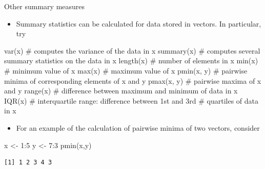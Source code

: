 \documentclass[
  9pt,
  a4paper,
  ignorenonframetext,
  notheorems]{beamer}
\newenvironment{Shaded}{\begin{snugshade}}{\end{snugshade}}
\newcommand{\CommentTok}[1]{\textcolor[rgb]{0.37,0.37,0.37}{#1}}
\newcommand{\DecValTok}[1]{\textcolor[rgb]{0.68,0.00,0.00}{#1}}
\newcommand{\FunctionTok}[1]{\textcolor[rgb]{0.28,0.35,0.67}{#1}}
\newcommand{\NormalTok}[1]{\textcolor[rgb]{0.00,0.23,0.31}{#1}}
\newcommand{\OtherTok}[1]{\textcolor[rgb]{0.00,0.23,0.31}{#1}}
\newcommand{\SpecialCharTok}[1]{\textcolor[rgb]{0.37,0.37,0.37}{#1}}
\providecommand{\tightlist}{%
  \setlength{\itemsep}{0pt}\setlength{\parskip}{0pt}}\usepackage{longtable,booktabs,array}
\begin{document}
\begin{frame}[fragile]
\begin{block}{Other summary measures}
\protect\hypertarget{other-summary-measures}{}
\begin{itemize}
\tightlist
\item
  Summary statistics can be calculated for data stored in vectors. In
  particular, try
\end{itemize}

\begin{Shaded}
\begin{Highlighting}[]
\FunctionTok{var}\NormalTok{(x) }\CommentTok{\# computes the variance of the data in x}
\FunctionTok{summary}\NormalTok{(x) }\CommentTok{\# computes several summary statistics on the data in x length(x) }
          \CommentTok{\# number of elements in x}
\FunctionTok{min}\NormalTok{(x) }\CommentTok{\# minimum value of x}
\FunctionTok{max}\NormalTok{(x) }\CommentTok{\# maximum value of x}
\FunctionTok{pmin}\NormalTok{(x, y) }\CommentTok{\# pairwise minima of corresponding elements of x and y pmax(x, y) }
          \CommentTok{\# pairwise maxima of x and y}
\FunctionTok{range}\NormalTok{(x) }\CommentTok{\# difference between maximum and minimum of data in x }
\FunctionTok{IQR}\NormalTok{(x) }\CommentTok{\# interquartile range: difference between 1st and 3rd}
        \CommentTok{\# quartiles of data in x}
\end{Highlighting}
\end{Shaded}

\begin{itemize}
\tightlist
\item
  For an example of the calculation of pairwise minima of two vectors,
  consider
\end{itemize}

\begin{Shaded}
\begin{Highlighting}[]
\NormalTok{x }\OtherTok{\textless{}{-}} \DecValTok{1}\SpecialCharTok{:}\DecValTok{5} 
\NormalTok{y }\OtherTok{\textless{}{-}} \DecValTok{7}\SpecialCharTok{:}\DecValTok{3} 
\FunctionTok{pmin}\NormalTok{(x,y)}
\end{Highlighting}
\end{Shaded}

\begin{verbatim}
[1] 1 2 3 4 3
\end{verbatim}
\end{block}
\end{frame}
\end{document}
